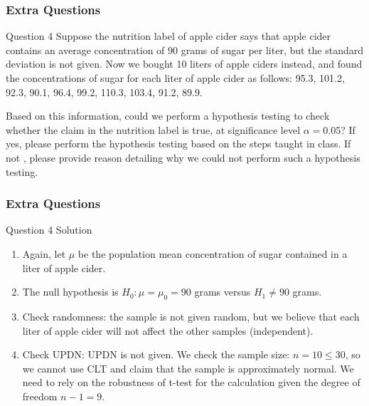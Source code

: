 \documentclass{beamer}
\begin{document}

\begin{frame}
\frametitle{Extra Questions}
\begin{block}{Question 4}
Suppose the nutrition label of apple cider says that apple cider contains an average concentration of 90 grams of sugar per liter, but the standard deviation is not given. Now we bought 10 liters of apple ciders instead, and found the concentrations of sugar for each liter of apple cider as follows: 95.3, 101.2, 92.3, 90.1, 96.4, 99.2, 110.3, 103.4, 91.2, 89.9. 

\vspace{5mm}
Based on this information, could we perform a hypothesis testing to check whether the claim in the nutrition label is true, at significance level $\alpha = 0.05$? If yes, please perform the hypothesis testing based on the steps taught in class. If not , please provide reason detailing why we could not perform such a hypothesis testing.

\end{block}
\end{frame}


\begin{frame}
\frametitle{Extra Questions}
\begin{block}{Question 4 Solution}

\begin{enumerate}
\item Again, let $\mu$ be the population mean concentration of sugar contained in a liter of apple cider.

\item The null hypothesis is $H_0: \mu = \mu_0 = 90$ grams versus $H_1 \ne 90$ grams.

\item Check randomness: the sample is not given random, but we believe that each liter of apple cider will not affect the other samples (independent).

\item Check UPDN: UPDN is not given. We check the sample size: $n = 10 \le 30$, so we cannot use CLT and claim that the sample is approximately normal. We need to rely on the robustness of t-test for the calculation given the degree of freedom $n-1 = 9$.

\end{enumerate}
\end{block}
\end{frame}
\end{document}
